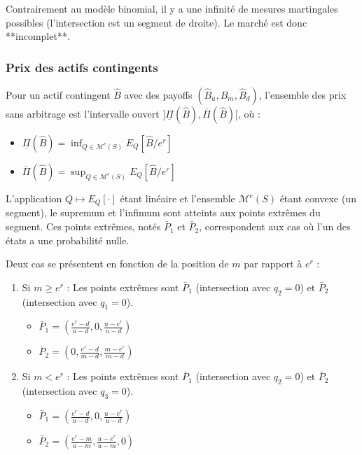 \documentclass[12pt,a4paper]{article}
\numberwithin{equation}{section}
\theoremstyle{plain} %
\theoremstyle{definition} %
\theoremstyle{remark} %
\theoremstyle{myexample}
\theoremstyle{definition}
\begin{document}
Contrairement au modèle binomial, il y a une infinité de mesures martingales possibles (l'intersection est un segment de droite). Le marché est donc **incomplet**.

\subsubsection{Prix des actifs contingents}
Pour un actif contingent $\hat{B}$ avec des payoffs $(\hat{B}_u, \hat{B}_m, \hat{B}_d)$, l'ensemble des prix sans arbitrage est l'intervalle ouvert $]\underline{\Pi}(\hat{B}), \overline{\Pi}(\hat{B})[$, où :
\begin{itemize}
    \item $\underline{\Pi}(\hat{B}) = \inf_{Q \in \mathcal{M}^e(S)} E_Q[\hat{B}/e^r]$
    \item $\overline{\Pi}(\hat{B}) = \sup_{Q \in \mathcal{M}^e(S)} E_Q[\hat{B}/e^r]$
\end{itemize}
L'application $Q \mapsto E_Q[\cdot]$ étant linéaire et l'ensemble $\mathcal{M}^e(S)$ étant convexe (un segment), le supremum et l'infimum sont atteints aux points extrêmes du segment. Ces points extrêmes, notés $\bar{P}_1$ et $\bar{P}_2$, correspondent aux cas où l'un des états a une probabilité nulle.

Deux cas se présentent en fonction de la position de $m$ par rapport à $e^r$ :
\begin{enumerate}
    \item Si $m \ge e^r$ : Les points extrêmes sont $\bar{P}_1$ (intersection avec $q_2=0$) et $\bar{P}_2$ (intersection avec $q_1=0$).
        \begin{itemize}
            \item $\bar{P}_1 = (\frac{e^r-d}{u-d}, 0, \frac{u-e^r}{u-d})$
            \item $\bar{P}_2 = (0, \frac{e^r-d}{m-d}, \frac{m-e^r}{m-d})$
        \end{itemize}
    \item Si $m < e^r$ : Les points extrêmes sont $\bar{P}_1$ (intersection avec $q_2=0$) et $\bar{P}_2$ (intersection avec $q_3=0$).
        \begin{itemize}
            \item $\bar{P}_1 = (\frac{e^r-d}{u-d}, 0, \frac{u-e^r}{u-d})$
            \item $\bar{P}_2 = (\frac{e^r-m}{u-m}, \frac{u-e^r}{u-m}, 0)$
        \end{itemize}
\end{enumerate}
\end{document}
